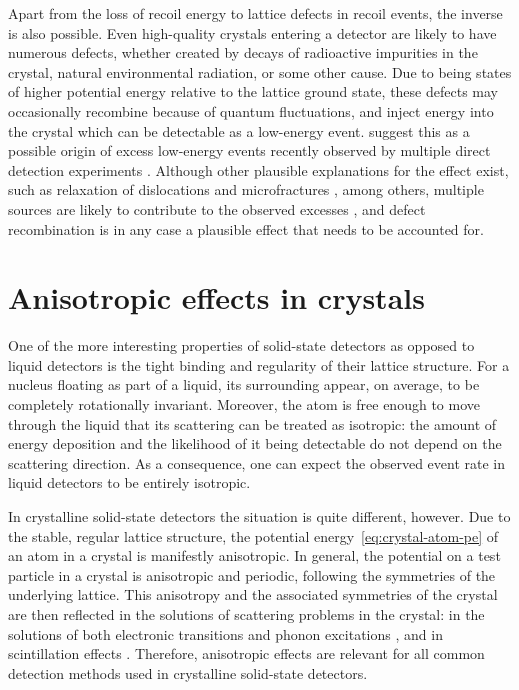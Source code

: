 Apart from the loss of recoil energy to lattice defects in recoil events, the inverse is also possible. Even high-quality crystals entering a detector are likely to have numerous defects, whether created by decays of radioactive impurities in the crystal, natural environmental radiation, or some other cause. Due to being states of higher potential energy relative to the lattice ground state, these defects may occasionally recombine because of quantum fluctuations, and inject energy into the crystal which can be detectable as a low-energy event. \textcite{NordlundEtAl2024} suggest this as a possible origin of excess low-energy events recently observed by multiple direct detection experiments \parencites{CRESSTIII2019, DAMIC2020, EDELWEISS2020, NUCLEUS2020, SENSEI2020, SuperCDMS2020}. Although other plausible explanations for the effect exist, such as relaxation of dislocations and microfractures \parencites{AnthonyPetersen2024, Romani2024}, among others, multiple sources are likely to contribute to the observed excesses \parencite{AdariEtAl2022}, and defect recombination is in any case a plausible effect that needs to be accounted for.

\section{Anisotropic effects in crystals}

One of the more interesting properties of solid-state detectors as opposed to liquid detectors is the tight binding and regularity of their lattice structure. For a nucleus floating as part of a liquid, its surrounding appear, on average, to be completely rotationally invariant. Moreover, the atom is free enough to move through the liquid that its scattering can be treated as isotropic: the amount of energy deposition and the likelihood of it being detectable do not depend on the scattering direction. As a consequence, one can expect the observed event rate in liquid detectors to be entirely isotropic.

In crystalline solid-state detectors the situation is quite different, however. Due to the stable, regular lattice structure, the potential energy~\eqref{eq:crystal-atom-pe} of an atom in a crystal is manifestly anisotropic. In general, the potential on a test particle in a crystal is anisotropic and periodic, following the symmetries of the underlying lattice. This anisotropy and the associated symmetries of the crystal are then reflected in the solutions of scattering problems in the crystal: in the solutions of both electronic transitions and phonon excitations \parencite{TrickleEtAl2020}, and in scintillation effects \parencite{SekiyaEtAl2003}. Therefore, anisotropic effects are relevant for all common detection methods used in crystalline solid-state detectors.


